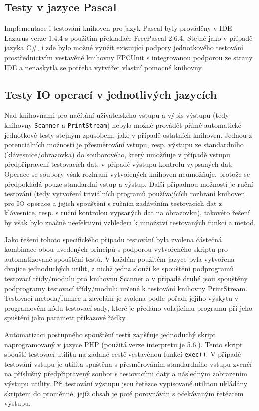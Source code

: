 \documentclass[onepage, a4paper, 12pt]{bakalarka}
\begin{document}
\subsection{Testy v jazyce Pascal}
Implementace i testování knihoven pro jazyk Pascal byly prováděny v IDE Lazarus verze 1.4.4 s použitím překladače FreePascal 2.6.4. Stejně jako v případě jazyka C\#, i zde bylo možné využít existující podpory jednotkového testování prostřednictvím vestavěné knihovny FPCUnit s integrovanou podporou ze strany IDE a nenaskytla se potřeba vytvářet vlastní pomocné knihovny.

\subsection{Testy IO operací v jednotlivých jazycích}
Nad knihovnami pro načítání uživatelského vstupu a výpis výstupu (tedy knihovny \texttt{Scanner} a \texttt{PrintStream}) nebylo možné provádět přímé automatické jednotkové testy stejným způsobem, jako v případě ostatních knihoven. Jednou z potenciálních možností je přesměrování vstupu, resp. výstupu ze standardního (klávesnice/obrazovka) do souborového, který umožňuje v případě vstupu předpřipravení testovacích dat, v případě výstupu kontrolu vypsaných dat. Operace se soubory však rozhraní vytvořených knihoven neumožňuje, protože se předpokládá pouze standardní vstup a výstup. Další případnou možností je ruční testování (tedy vytvoření triviálních programů používajících rozhraní knihoven pro IO operace a jejich spouštění s ručním zadáváním testovacích dat z klávesnice, resp. s ruční kontrolou vypsaných dat na obrazovku), takovéto řešení by však bylo značně neefektivní vzhledem k množství testovaných funkcí a metod.\par
Jako řešení tohoto specifického případu testování byla zvolena částečná kombinace obou uvedených principů s podporou vytvořeného skriptu pro automatizované spouštění testů. V každém použitém jazyce byla vytvořena dvojice jednoduchých utilit, z nichž jedna slouží ke spouštění podprogramů testovací třídy/modulu pro knihovnu Scanner a v případě druhé jsou spouštěny podprogramy testovací třídy/modulu určené k testování knihovny PrintStream. Testovací metoda/funkce k zavolání je zvolena podle pořadí jejího výskytu v programovém kódu testovací sady, které je předáno volajícímu programu při jeho spuštění jako parametr příkazové řádky.\par
Automatizaci postupného spouštění testů zajišťuje jednoduchý skript naprogramovaný v jazyce PHP (použitá verze interpretu je 5.6.). Tento skript spouští testovací utilitu na zadané cestě vestavěnou funkcí \texttt{exec()}. V případě testování vstupu je utilita spuštěna s přesměrováním standardního vstupu zvenčí na příslušný předpřipravený soubor s testovacími daty a následným zobrazením výstupu utility. Při testování výstupu jsou řetězce vypisované utilitou ukládány skriptem do proměnné, jejíž obsah je poté porovnáván s očekávaným řetězcem výstupu.
\end{document}
